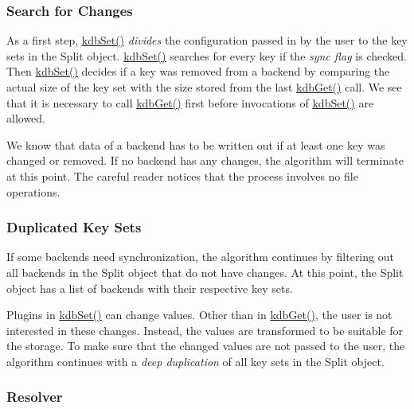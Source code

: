 \subsubsection*{Search for Changes}

As a first step, {\ttfamily \hyperlink{group__kdb_ga11436b058408f83d303ca5e996832bcf}{kdb\+Set()}} {\itshape divides} the configuration passed in by the user to the key sets in the {\ttfamily Split} object. {\ttfamily \hyperlink{group__kdb_ga11436b058408f83d303ca5e996832bcf}{kdb\+Set()}} searches for every key if the {\itshape sync flag} is checked. Then {\ttfamily \hyperlink{group__kdb_ga11436b058408f83d303ca5e996832bcf}{kdb\+Set()}} decides if a key was removed from a backend by comparing the actual size of the key set with the size stored from the last {\ttfamily \hyperlink{group__kdb_ga28e385fd9cb7ccfe0b2f1ed2f62453a1}{kdb\+Get()}} call. We see that it is necessary to call {\ttfamily \hyperlink{group__kdb_ga28e385fd9cb7ccfe0b2f1ed2f62453a1}{kdb\+Get()}} first before invocations of {\ttfamily \hyperlink{group__kdb_ga11436b058408f83d303ca5e996832bcf}{kdb\+Set()}} are allowed.

We know that data of a backend has to be written out if at least one key was changed or removed. If no backend has any changes, the algorithm will terminate at this point. The careful reader notices that the process involves no file operations.

\subsubsection*{Duplicated Key Sets}

If some backends need synchronization, the algorithm continues by filtering out all backends in the {\ttfamily Split} object that do not have changes. At this point, the {\ttfamily Split} object has a list of backends with their respective key sets.

Plugins in {\ttfamily \hyperlink{group__kdb_ga11436b058408f83d303ca5e996832bcf}{kdb\+Set()}} can change values. Other than in {\ttfamily \hyperlink{group__kdb_ga28e385fd9cb7ccfe0b2f1ed2f62453a1}{kdb\+Get()}}, the user is not interested in these changes. Instead, the values are transformed to be suitable for the storage. To make sure that the changed values are not passed to the user, the algorithm continues with a {\itshape deep duplication} of all key sets in the {\ttfamily Split} object.

\subsubsection*{Resolver}


